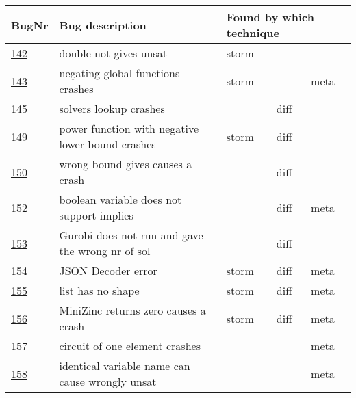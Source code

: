 \begin{table}[]
	\centering
	\begin{tabular}{lllll}
		BugNr & Bug description                                           & \multicolumn{3}{l}{Found by which technique} \\ \toprule
		\href{https://github.com/CPMpy/cpmpy/issues/142}{142}   & double not gives unsat                                    & storm          &              &              \\
		\href{https://github.com/CPMpy/cpmpy/issues/143}{143}   & negating global functions crashes                         & storm          &              & meta         \\
		\href{https://github.com/CPMpy/cpmpy/issues/145}{145}   & solvers lookup crashes                                    &                & diff         &              \\
		\href{https://github.com/CPMpy/cpmpy/issues/149}{149}   & power function with negative lower bound crashes          & storm          & diff         &              \\
		\href{https://github.com/CPMpy/cpmpy/issues/150}{150}   & wrong bound gives causes a crash                          &                & diff         &              \\
		\href{https://github.com/CPMpy/cpmpy/issues/152}{152}   & boolean variable does not support implies                 &                & diff         & meta         \\
		\href{https://github.com/CPMpy/cpmpy/issues/153}{153}   & Gurobi does not run and gave the wrong nr of sol         &                & diff         &              \\
		\href{https://github.com/CPMpy/cpmpy/issues/154}{154}   & JSON Decoder error                                        & storm          & diff         & meta         \\
		\href{https://github.com/CPMpy/cpmpy/issues/155}{155}   & list has no shape                                         & storm          & diff         & meta         \\
		\href{https://github.com/CPMpy/cpmpy/issues/156}{156}   & MiniZinc returns zero causes a crash                      & storm          & diff         & meta         \\
		\href{https://github.com/CPMpy/cpmpy/issues/157}{157}   & circuit of one element crashes                            &                &              & meta         \\
		\href{https://github.com/CPMpy/cpmpy/issues/158}{158}   & identical variable name can cause wrongly unsat           &                &              & meta         \\

\end{tabular}
\end{table}
